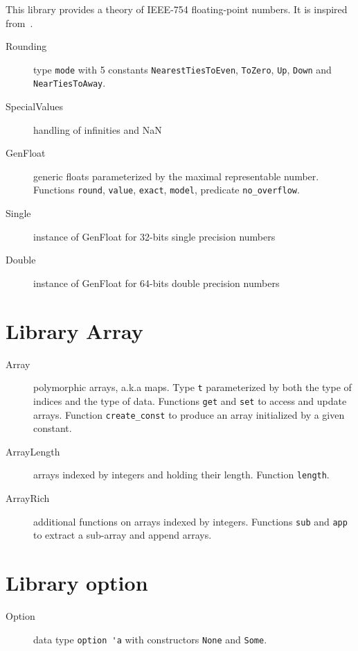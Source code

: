 This library provides a theory of IEEE-754 floating-point numbers. It
is inspired from~\cite{ayad10ijcar}.

\begin{description}
\item[Rounding] type \verb|mode| with 5 constants
  \verb|NearestTiesToEven|, \verb|ToZero|, \verb|Up|, \verb|Down| and
  \verb|NearTiesToAway|.
\item[SpecialValues] handling of infinities and NaN
\item[GenFloat] generic floats parameterized by the maximal
  representable number. Functions \verb|round|, \verb|value|,
  \verb|exact|, \verb|model|, predicate \verb|no_overflow|.
\item[Single] instance of GenFloat for 32-bits single precision numbers
\item[Double] instance of GenFloat for 64-bits double precision numbers
\end{description}


\section{Library Array}

\begin{description}

\item[Array] polymorphic arrays, a.k.a maps. Type \verb|t|
  parameterized by both the type of indices and the type of
  data. Functions \verb|get| and \verb|set| to access and update
  arrays. Function \verb|create_const| to produce an array initialized
  by a given constant.

\item[ArrayLength] arrays indexed by integers and holding their
  length. Function \verb|length|.

\item[ArrayRich] additional functions on arrays indexed by
  integers. Functions \verb|sub| and \verb|app| to extract a sub-array
  and append arrays.

\end{description}

\section{Library option}

\begin{description}
\item[Option] data type \verb|option 'a| with constructors \verb|None| and
  \verb|Some|.
\end{description}


